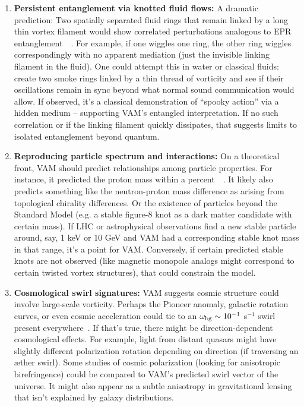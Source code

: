 \documentclass[preprint]{revtex4-2}
\begin{document}
\begin{enumerate}
        \item \textbf{Persistent entanglement via knotted fluid flows:}
        A dramatic prediction: Two spatially separated fluid rings that remain linked by a long thin vortex filament would show correlated perturbations analogous to EPR entanglement~\cite{reference_249}~\cite{reference_250}. For example, if one wiggles one ring, the other ring wiggles correspondingly with no apparent mediation (just the invisible linking filament in the fluid). One could attempt this in water or classical fluids: create two smoke rings linked by a thin thread of vorticity and see if their oscillations remain in sync beyond what normal sound communication would allow. If observed, it’s a classical demonstration of “spooky action” via a hidden medium – supporting VAM’s entangled interpretation. If no such correlation or if the linking filament quickly dissipates, that suggests limits to isolated entanglement beyond quantum.

        \item \textbf{Reproducing particle spectrum and interactions:}
        On a theoretical front, VAM should predict relationships among particle properties. For instance, it predicted the proton mass within a percent~\cite{reference_251}~\cite{reference_252}. It likely also predicts something like the neutron-proton mass difference as arising from topological chirality differences. Or the existence of particles beyond the Standard Model (e.g. a stable figure-8 knot as a dark matter candidate with certain mass). If LHC or astrophysical observations find a new stable particle around, say, 1 keV or 10 GeV and VAM had a corresponding stable knot mass in that range, it’s a point for VAM. Conversely, if certain predicted stable knots are not observed (like magnetic monopole analogs might correspond to certain twisted vortex structures), that could constrain the model.

        \item \textbf{Cosmological swirl signatures:}
        VAM suggests cosmic structure could involve large-scale vorticity. Perhaps the Pioneer anomaly, galactic rotation curves, or even cosmic acceleration could tie to an $\omega_{\rm bg} \sim 10^{-1}$ s$^{-1}$ swirl present everywhere~\cite{reference_253}. If that’s true, there might be direction-dependent cosmological effects. For example, light from distant quasars might have slightly different polarization rotation depending on direction (if traversing an æther swirl). Some studies of cosmic polarization (looking for anisotropic birefringence) could be compared to VAM’s predicted swirl vector of the universe. It might also appear as a subtle anisotropy in gravitational lensing that isn’t explained by galaxy distributions.


\end{enumerate}
\end{document}

